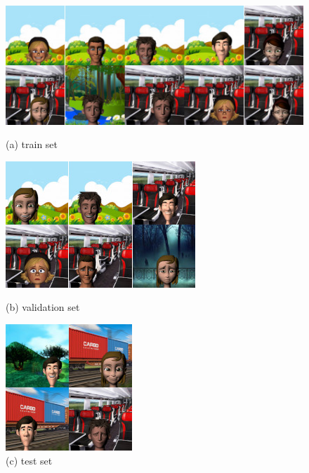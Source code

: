 \documentclass{article} %
\begin{document}
\begin{figure}[h]
    \includegraphics[width=\textwidth]{res/train.jpg}
    \caption*{(a) train set}
    \endminipage\hfill
    \includegraphics[width=\textwidth]{res/valid.jpg}
    \caption*{(b) validation set}
    \endminipage\hfill
    \includegraphics[width=\textwidth]{res/test.jpg}
    \caption*{(c) test set}
    \endminipage\hfill
\end{figure}
\end{document}
